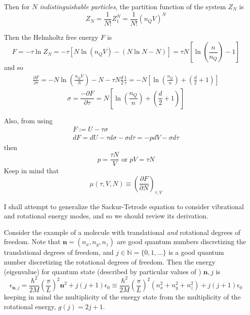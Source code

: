 \documentclass[10pt]{amsart}
\begin{document}
\begin{multicols*}{2}
Then for $N$ \emph{indistinguishable particles}, the partition function of the system $Z_N$ is 
\begin{equation}
  Z_N = \frac{1}{N!} Z_1^N = \frac{1}{N!}(n_QV)^N
\end{equation}

Then the Helmholtz free energy $F$ is 
\begin{equation}
  F = -\tau \ln{Z_N} = -\tau \left[ N \ln{ (n_Q V) } - (N\ln{N} - N) \right] = \tau N \left[ \ln{ \left( \frac{n}{n_Q} \right) - 1  }\right]
\end{equation}
and so 
\[
\begin{gathered}
  \frac{ \partial F}{ \partial \tau} = - N \ln{ \left( \frac{n_Q V}{N} \right) } - N - \tau N \frac{d}{2} \frac{1}{\tau}  = -N \left[ \ln{ \left( \frac{n_Q}{n} \right) } + \left( \frac{d}{2} + 1 \right) \right] 
\end{gathered}
\]
\begin{equation}
  \sigma = \frac{ -\partial F}{ \partial \tau} = N \left[ \ln{ \left( \frac{n_Q}{n} \right) } + \left( \frac{d}{2} + 1 \right) \right]
\end{equation}

Also, from using 
\[
\begin{gathered}
  F := U -\tau \sigma \\ 
  dF = dU -\tau d\sigma - \sigma d\tau = - p dV - \sigma d\tau 
\end{gathered}
\]
then
\[
p=\frac{\tau N}{V} \text{ or } pV = \tau N
\]
Keep in mind that 
\[
\mu(\tau, V,N) \equiv \left( \frac{ \partial F}{\partial N} \right)_{\tau,V}
\]

I shall attempt to generalize the Sackur-Tetrode equation to consider vibrational and rotational energy modes, and so we should review its derivation.  

Consider the example of a molecule with translational \emph{and } rotational degrees of freedom.  Note that $\mathbf{n} = (n_x,n_y,n_z)$ are good quantum numbers discretizing the translational degrees of freedom, and $j \in \mathbb{N} = \lbrace 0 ,1 , \dots \rbrace$ is a good quantum number discretizing the rotational degrees of freedom.  Then the energy (eigenvalue) for quantum state (described by particular values of ) $\mathbf{n},j$ is
\[
\epsilon_{\mathbf{n},j} = \frac{ \hbar^2}{2M} \left( \frac{\pi}{L} \right)^2 \mathbf{n}^2 + j(j+1) \epsilon_0 \equiv \frac{\hbar^2}{2M} \left( \frac{\pi}{L} \right)^2 (n_x^2 + n_y^2 + n_z^2 ) + j(j+1) \epsilon_0
\]
keeping in mind the multiplicity of the energy state from the multiplicity of the rotational energy, $g(j) = 2j+1$.  


\end{multicols*}
\end{document}
